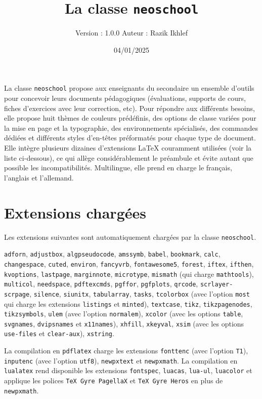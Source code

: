 \documentclass[
    french,
    margin=2cm
]{neoschool}
\title{La classe \texttt{neoschool}}
\author{Version : 1.0.0 \quad\textemdash{}\quad Auteur : Razik Ikhlef}
\date{04/01/2025}
\begin{document}
\maketitle

La classe \texttt{neoschool} propose aux enseignants du secondaire un
ensemble d'outils pour concevoir leurs documents pédagogiques (évaluations,
supports de cours, fiches d'exercices avec leur correction, etc). Pour répondre
aux différents besoins, elle propose huit thèmes de couleurs prédéfinis, des
options de classe variées pour la mise en page et la typographie, des
environnements spécialisés, des commandes dédiées et différents styles
d'en-têtes préformatés pour chaque type de document. Elle intègre plusieurs
dizaines d'extensions LaTeX couramment utilisées (voir la liste ci-dessous), ce
qui allège considérablement le préambule et évite autant que possible les
incompatibilités. Multilingue, elle prend en charge le français, l'anglais et
l'allemand.

\tableofcontents

\section{Extensions chargées}

Les extensions suivantes sont automatiquement chargées par la classe \texttt{neoschool}.

\texttt{adforn}, \texttt{adjustbox}, \texttt{algpseudocode}, \texttt{amssymb}, \texttt{babel}, \texttt{bookmark}, \texttt{calc}, \texttt{changespace}, \texttt{cuted}, \texttt{environ}, \texttt{fancyvrb}, \texttt{fontawesome5}, \texttt{forest}, \texttt{iftex}, \texttt{ifthen}, \texttt{kvoptions}, \texttt{lastpage}, \texttt{marginnote}, \texttt{microtype}, \texttt{mismath} (qui charge \texttt{mathtools}), \texttt{multicol}, \texttt{needspace}, \texttt{pdftexcmds}, \texttt{pgffor}, \texttt{pgfplots}, \texttt{qrcode}, \texttt{scrlayer-scrpage}, \texttt{silence}, \texttt{siunitx}, \texttt{tabularray}, \texttt{tasks}, \texttt{tcolorbox} (avec l'option \texttt{most} qui charge les extensions \texttt{listings} et \texttt{minted}), \texttt{textcase}, \texttt{tikz}, \texttt{tikzpagenodes}, \texttt{tikzsymbols}, \texttt{ulem} (avec l'option \texttt{normalem}), \texttt{xcolor} (avec les options \texttt{table}, \texttt{svgnames}, \texttt{dvipsnames} et \texttt{x11names}), \texttt{xhfill}, \texttt{xkeyval}, \texttt{xsim} (avec les options \texttt{use-files} et \texttt{clear-aux}), \texttt{xstring}.

La compilation en \texttt{pdflatex} charge les extensions \texttt{fonttenc} (avec l'option \texttt{T1}), \texttt{inputenc} (avec l'option \texttt{utf8}), \texttt{newpxtext} et \texttt{newpxmath}. La compilation en \texttt{lualatex} rend disponible les extensions \texttt{fontspec}, \texttt{luacas}, \texttt{lua-ul}, \texttt{luacolor} et applique les polices \texttt{TeX Gyre PagellaX} et \texttt{TeX Gyre Heros} en plus de \texttt{newpxmath}.
\end{document}
